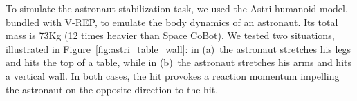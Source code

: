 \documentclass{article}
\begin{document}






To simulate the astronaut stabilization task, we used the Astri
humanoid model, bundled with V-REP, to emulate the body dynamics of an
astronaut. Its total mass is 73Kg (12 times heavier than Space
CoBot). We tested two situations, illustrated in
Figure~\ref{fig:astri_table_wall}: in (a)~the astronaut stretches his
legs and hits the top of a table, while in (b)~the astronaut stretches his
arms and hits a vertical wall. In both cases, the hit provokes a
reaction momentum impelling the astronaut on the opposite direction to
the hit.
\end{document}
